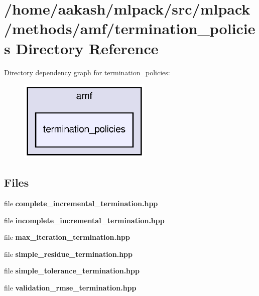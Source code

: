 \section{/home/aakash/mlpack/src/mlpack/methods/amf/termination\+\_\+policies Directory Reference}
\label{dir_c5874ad48fbf1d21a244b283cb97025e}
Directory dependency graph for termination\+\_\+policies\+:
\nopagebreak
\begin{figure}[H]
\begin{center}
\leavevmode
\includegraphics[width=180pt]{dir_c5874ad48fbf1d21a244b283cb97025e_dep}
\end{center}
\end{figure}
\subsection*{Files}
\begin{DoxyCompactItemize}
\item 
file \textbf{ complete\+\_\+incremental\+\_\+termination.\+hpp}
\item 
file \textbf{ incomplete\+\_\+incremental\+\_\+termination.\+hpp}
\item 
file \textbf{ max\+\_\+iteration\+\_\+termination.\+hpp}
\item 
file \textbf{ simple\+\_\+residue\+\_\+termination.\+hpp}
\item 
file \textbf{ simple\+\_\+tolerance\+\_\+termination.\+hpp}
\item 
file \textbf{ validation\+\_\+rmse\+\_\+termination.\+hpp}
\end{DoxyCompactItemize}
